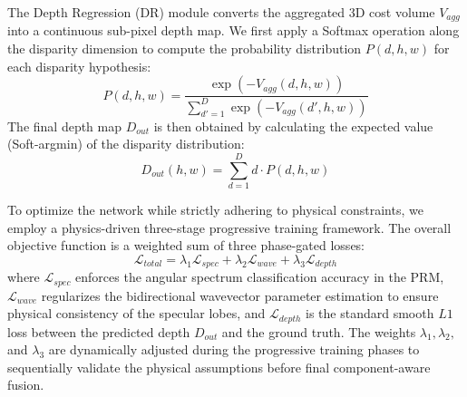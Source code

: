 The Depth Regression (DR) module converts the aggregated 3D cost volume $V_{agg}$ into a continuous sub-pixel depth map. We first apply a Softmax operation along the disparity dimension to compute the probability distribution $P(d, h, w)$ for each disparity hypothesis:
\begin{equation}
\label{eq:eq32}
P(d, h, w) = \frac{\exp(-V_{agg}(d, h, w))}{\sum_{d'=1}^{D} \exp(-V_{agg}(d', h, w))}
\end{equation}
The final depth map $D_{out}$ is then obtained by calculating the expected value (Soft-argmin) of the disparity distribution:
\begin{equation}
\label{eq:eq33}
D_{out}(h, w) = \sum_{d=1}^{D} d \cdot P(d, h, w)
\end{equation}

To optimize the network while strictly adhering to physical constraints, we employ a physics-driven three-stage progressive training framework. The overall objective function is a weighted sum of three phase-gated losses:
\begin{equation}
\label{eq:eq34}
\mathcal{L}_{total} = \lambda_1 \mathcal{L}_{spec} + \lambda_2 \mathcal{L}_{wave} + \lambda_3 \mathcal{L}_{depth}
\end{equation}
where $\mathcal{L}_{spec}$ enforces the angular spectrum classification accuracy in the PRM, $\mathcal{L}_{wave}$ regularizes the bidirectional wavevector parameter estimation to ensure physical consistency of the specular lobes, and $\mathcal{L}_{depth}$ is the standard smooth $L1$ loss between the predicted depth $D_{out}$ and the ground truth. The weights $\lambda_1, \lambda_2,$ and $\lambda_3$ are dynamically adjusted during the progressive training phases to sequentially validate the physical assumptions before final component-aware fusion.